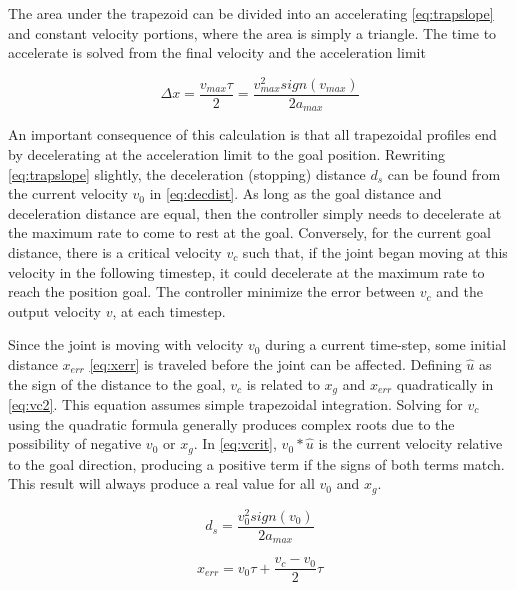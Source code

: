 The area under the trapezoid can be divided into an accelerating
\eqref{eq:trapslope} and constant velocity portions, where the area is simply a
triangle. The time to accelerate is solved from the final velocity and the
acceleration limit

\begin{equation}
\label{eq:trapslope}
\Delta x=\frac{v_{max}\tau}{2}=\frac{v_{max}^2 sign(v_{max})}{2a_{max}}
\end{equation}

An important consequence of this calculation is that all trapezoidal profiles
end by decelerating at the acceleration limit to the goal position. Rewriting
\eqref{eq:trapslope} slightly, the deceleration (stopping) distance $d_s$ can be found
from the current velocity $v_0$ in \eqref{eq:decdist}. As long as the goal
distance and deceleration distance are equal, then the controller simply
needs to decelerate at the maximum rate to come to rest at the goal.
Conversely, for the current goal distance, there is a critical velocity $v_c$
such that, if the joint began moving at this velocity in the following
timestep, it could decelerate at the maximum rate to reach the position goal.
The controller minimize the error between $v_c$ and the output velocity $v$,
at each timestep.

Since the joint is moving with velocity $v_0$ during a current time-step, some
initial distance $x_{err}$ \eqref{eq:xerr} is traveled before the joint can be
affected. Defining $\hat{u}$ as the sign of the distance to the goal, $v_c$ is
related to $x_g$ and $x_{err}$ quadratically in \eqref{eq:vc2}. This equation
assumes simple trapezoidal integration. Solving for $v_c$ using the quadratic
formula generally produces complex roots due to the possibility of negative
$v_0$ or $x_g$.  In \eqref{eq:vcrit}, $v_0*\hat{u}$ is the current velocity
relative to the goal direction, producing a positive term if the signs of both
terms match. This result will always produce a real value for all $v_0$ and
$x_g$.

\begin{equation}
\label{eq:decdist}
d_s=\frac{v_0^2 sign(v_0)}{2 a_{max}}
\end{equation}

\begin{equation}
\label{eq:xerr}
x_{err}=v_0 \tau + \frac{v_c-v_0}{2}\tau
\end{equation}

